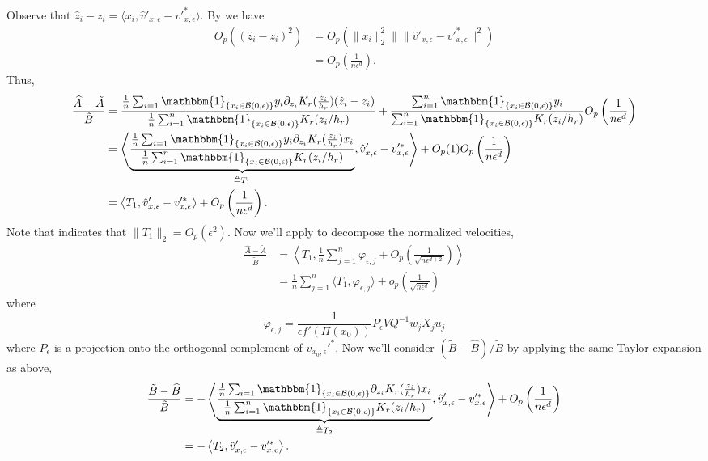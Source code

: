 \documentclass[11pt]{article}
\begin{document}
Observe that $\hat{z}_i - z_i = \langle x_i , \hat{v}'_{x, \epsilon} - v'^*_{x, \epsilon}\rangle$. By  we have
\begin{align*}
    O_p((\hat{z}_i - z_i)^2) &= O_p(\|x_i\|_2^2\|\|\hat{v}'_{x, \epsilon} - v'^*_{x, \epsilon}\|^2) \\
    &= O_p\left(\frac{1}{n\epsilon^{d}}\right).
\end{align*}
Thus,
\begin{align*}
    \frac{\widehat{A} - \tilde{A}}{\tilde{B}} &= \frac{\frac{1}{n}\sum_{i = 1}\mathbbm{1}_{\{x_i \in \mathcal{B}(0, \epsilon)\}}y_i\partial_{z_i}K_r(\frac{z_i}{h_r})(\hat{z}_i - z_i)}{\frac{1}{n}\sum_{i = 1}^n\mathbbm{1}_{\{x_i \in \mathcal{B}(0, \epsilon)\}}K_r(z_i/h_r)} + \frac{\sum_{i=1}^n\mathbbm{1}_{\{x_i \in \mathcal{B}(0, \epsilon)\}}y_i}{\sum_{i = 1}^n\mathbbm{1}_{\{x_i \in \mathcal{B}(0, \epsilon)\}}K_r(z_i/h_r)} O_p\left(\frac{1}{n\epsilon^{d}}\right) \\
    &= \left\langle\underbrace{\frac{\frac{1}{n}\sum_{i = 1}\mathbbm{1}_{\{x_i \in \mathcal{B}(0, \epsilon)\}}y_i\partial_{z_i}K_r(\frac{z_i}{h_r})x_i}{\frac{1}{n}\sum_{i = 1}^n\mathbbm{1}_{\{x_i \in \mathcal{B}(0, \epsilon)\}}K_r(z_i/h_r)}}_{\triangleq T_1}, \hat{v}'_{x, \epsilon} -v'^*_{x, \epsilon}\right\rangle + O_p(1)O_p\left(\frac{1}{n\epsilon^{d}}\right) \\
    &= \left\langle T_{1}, \hat{v}'_{x, \epsilon} -v'^*_{x, \epsilon}\right\rangle + O_p\left(\frac{1}{n\epsilon^{d}}\right).
\end{align*}
Note that  indicates that $\|T_1\|_2 = O_p(\epsilon^2)$. Now we'll apply  to decompose the normalized velocities,
\begin{align*}
    \frac{\widehat{A} - \tilde{A}}{\tilde{B}} &= \left\langle T_{1}, \frac{1}{n}\sum_{j = 1}^n\varphi_{\epsilon, j}  + O_p\left(\frac{1}{\sqrt{n\epsilon^{d+2}}}\right)\right\rangle \\
    &= \frac{1}{n}\sum_{j = 1}^n\langle T_{1}, \varphi_{\epsilon, j}\rangle + o_p\left(\frac{1}{\sqrt{n\epsilon^{d}}}\right)
\end{align*}
where 
\[\varphi_{\epsilon, j} = \frac{1}{\epsilon f'(\Pi(x_0))}P_{\epsilon}VQ^{-1}w_jX_ju_j\]
where $P_{\epsilon}$ is a projection onto the orthogonal complement of $v_{x_0, \epsilon}'^{*}$.  Now we'll consider $(\tilde{B} - \widehat{B})/\tilde{B}$ by applying the same Taylor expansion as above,
\begin{align*}
    \frac{\tilde{B} - \widehat{B}}{\tilde{B}} &= -\left\langle\underbrace{\frac{\frac{1}{n}\sum_{i = 1}\mathbbm{1}_{\{x_i \in \mathcal{B}(0, \epsilon)\}}\partial_{z_i}K_r(\frac{z_i}{h_r})x_i}{\frac{1}{n}\sum_{i = 1}^n\mathbbm{1}_{\{x_i \in \mathcal{B}(0, \epsilon)\}}K_r(z_i/h_r)}}_{\triangleq T_2}, \hat{v}'_{x, \epsilon} -v'^*_{x, \epsilon}\right\rangle + O_p\left(\frac{1}{n\epsilon^{d}}\right)\\
    &= -\left\langle T_2, \hat{v}'_{x, \epsilon} -v'^*_{x, \epsilon}\right\rangle.
\end{align*}
\end{document}
